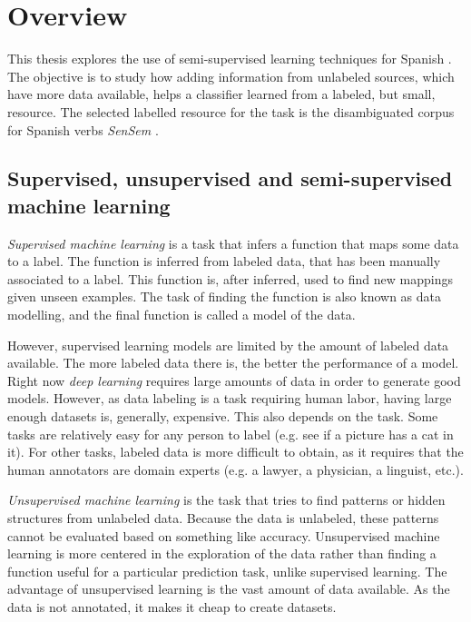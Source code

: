 \section{Overview}\label{section:introduction:overview} 

This thesis explores the use of semi-supervised learning techniques for Spanish
\vsd. The objective is to study how adding information from unlabeled sources,
which have more data available, helps a classifier learned from a labeled, but
small, resource. The selected labelled resource for the task is the
disambiguated corpus for Spanish verbs {\em SenSem}
\cite{alonso-etal-07-sensem}.

\subsection{Supervised, unsupervised and semi-supervised\\machine learning}

{\em Supervised machine learning} is a task that infers a function that maps
some data to a label. The function is inferred from labeled data, that has been
manually associated to a label. This function is, after inferred, used to find
new mappings given unseen examples. The task of finding the function is also
known as data modelling, and the final function is called a model of the data.

However, supervised learning models are limited by the amount of labeled data
available. The more labeled data there is, the better the performance of a
model. Right now {\em deep learning} requires large amounts of data in order to
generate good models. However, as data labeling is a task requiring human
labor, having large enough datasets is, generally, expensive. This also depends
on the task. Some tasks are relatively easy for any person to label (e.g. see
if a picture has a cat in it). For other tasks, labeled data is more difficult
to obtain, as it requires that the human annotators are domain experts (e.g. a
lawyer, a physician, a linguist, etc.).

{\em Unsupervised machine learning} is the task that tries to find patterns or
hidden structures from unlabeled data. Because the data is unlabeled, these
patterns cannot be evaluated based on something like accuracy. Unsupervised
machine learning is more centered in the exploration of the data rather than
finding a function useful for a particular prediction task, unlike supervised
learning. The advantage of unsupervised learning is the vast amount of data
available. As the data is not annotated, it makes it cheap to create datasets.

